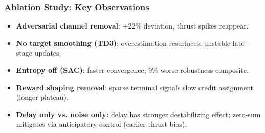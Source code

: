 
\begin{frame}
  \frametitle{Ablation Study: Key Observations}
  \small
  \begin{itemize}\setlength{\itemsep}{4pt}
    \item \textbf{Adversarial channel removal}: +22\% deviation, thrust spikes reappear.
    \item \textbf{No target smoothing (TD3)}: overestimation resurfaces, unstable late-stage updates.
    \item \textbf{Entropy off (SAC)}: faster convergence, 9\% worse robustness composite.
    \item \textbf{Reward shaping removal}: sparse terminal signals slow credit assignment (longer plateau).
    \item \textbf{Delay only vs. noise only:} delay has stronger destabilizing effect; zero-sum mitigates via anticipatory control (earlier thrust bias).
  \end{itemize}
\end{frame}

